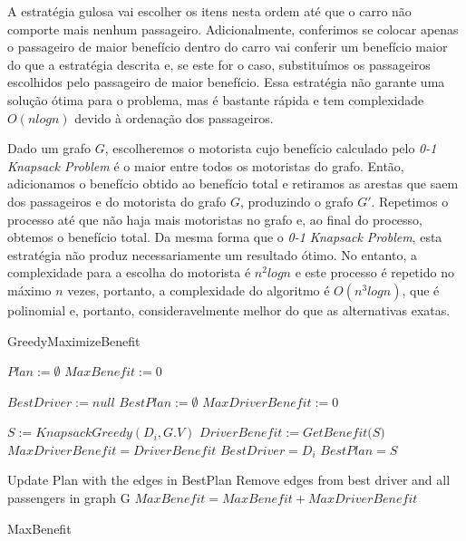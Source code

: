 \documentclass{article}
\begin{document}
A estratégia gulosa vai escolher os itens nesta ordem até que o carro não comporte mais nenhum passageiro. Adicionalmente,
conferimos se colocar apenas o passageiro de maior benefício dentro do carro vai conferir um benefício maior do que a estratégia
descrita e, se este for o caso, substituímos os passageiros escolhidos pelo passageiro de maior benefício. Essa estratégia não
garante uma solução ótima para o problema, mas é bastante rápida e tem complexidade $ O(nlogn) $ devido à ordenação dos passageiros.

Dado um grafo $ G $, escolheremos o motorista cujo benefício calculado pelo \textit{0-1 Knapsack Problem} é o maior entre
todos os motoristas do grafo. Então, adicionamos o benefício obtido ao benefício total e retiramos as arestas 
que saem dos passageiros e do motorista do grafo $ G $, produzindo o grafo $ G' $. Repetimos o processo até que não haja mais 
motoristas no grafo e, ao final do processo, obtemos o benefício total. Da mesma forma que o \textit{0-1 Knapsack Problem}, esta estratégia não
produz necessariamente um resultado ótimo. No entanto, a complexidade para a escolha do motorista é $ n^2logn $ e este processo é repetido
no máximo $ n $ vezes, portanto, a complexidade do algoritmo é $ O(n^3logn) $, que é polinomial e, portanto, consideravelmente melhor do 
que as alternativas exatas.

\begin{algorithm}
\caption{GreedyMaximizeBenefit}
\begin{algorithmic}[1]

\State $ Plan := \emptyset $
\State $ MaxBenefit := 0 $
\item {}
  \State $ BestDriver := null $
  \State $ BestPlan := \emptyset $
  \State $ MaxDriverBenefit := 0 $
  \item {}
    \State $ S := KnapsackGreedy(D_i, G.V) $
    \State $ DriverBenefit := \textit{GetBenefit(S)} $
      \State $ MaxDriverBenefit = DriverBenefit $
      \State $ BestDriver = D_i $
      \State $ BestPlan = S $
    \EndIf
  \EndFor

  \State Update Plan with the edges in BestPlan
  \State Remove edges from best driver and all passengers in graph G
  \State $ MaxBenefit = MaxBenefit + MaxDriverBenefit $
\EndWhile

\Return MaxBenefit

\EndProcedure
\end{algorithmic}
\label{alg:greedy_algorithm}
\end{algorithm}
\end{document}
